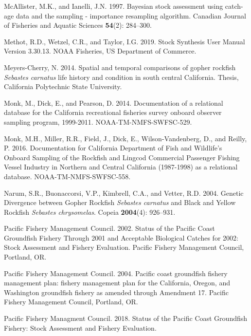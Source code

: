 \documentclass[12pt,]{article}
\begin{document}
\hypertarget{ref-McAllister1997}{}
McAllister, M.K., and Ianelli, J.N. 1997. Bayesian stock assessment
using catch-age data and the sampling - importance resampling algorithm.
Canadian Journal of Fisheries and Aquatic Sciences \textbf{54}(2):
284--300.

\hypertarget{ref-Methot2019}{}
Methot, R.D., Wetzel, C.R., and Taylor, I.G. 2019. Stock Synthesis User
Manual Version 3.30.13. NOAA Fisheries, US Department of Commerce.

\hypertarget{ref-MeyersCherry2014}{}
Meyers-Cherry, N. 2014. Spatial and temporal comparisons of gopher
rockfish \emph{Sebastes carnatus} life history and condition in south
central California. Thesis, California Polytechnic State University.

\hypertarget{ref-Monk2014}{}
Monk, M., Dick, E., and Pearson, D. 2014. Documentation of a relational
database for the California recreational fisheries survey onboard
observer sampling program, 1999-2011. NOAA-TM-NMFS-SWFSC-529.

\hypertarget{ref-Monk2016}{}
Monk, M.H., Miller, R.R., Field, J., Dick, E., Wilson-Vandenberg, D.,
and Reilly, P. 2016. Documentation for California Department of Fish and
Wildlife's Onboard Sampling of the Rockfish and Lingcod Commercial
Passenger Fishing Vessel Industry in Northern and Central California
(1987-1998) as a relational database. NOAA-TM-NMFS-SWFSC-558.

\hypertarget{ref-Narum2004}{}
Narum, S.R., Buonaccorsi, V.P., Kimbrell, C.A., and Vetter, R.D. 2004.
Genetic Divergence between Gopher Rockfish \emph{Sebastes carnatus} and
Black and Yellow Rockfish \emph{Sebastes chrysomelas}. Copeia
\textbf{2004}(4): 926--931.

\hypertarget{ref-PFMC2002}{}
Pacific Fishery Management Council. 2002. Status of the Pacific Coast
Groundfish Fishery Through 2001 and Acceptable Biological Catches for
2002: Stock Assessment and Fishery Evaluation. Pacific Fishery
Management Council, Portland, OR.

\hypertarget{ref-PFMC2004}{}
Pacific Fishery Management Council. 2004. Pacific coast groundfish
fishery management plan: fishery management plan for the California,
Oregon, and Washington groundfish fishery as amended through Amendment
17. Pacific Fishery Management Council, Portland, OR.

\hypertarget{ref-PSMFC2018}{}
Pacific Fishery Managment Council. 2018. Status of the Pacific Coast
Groundfish Fishery: Stock Assessment and Fishery Evaluation.
\end{document}
